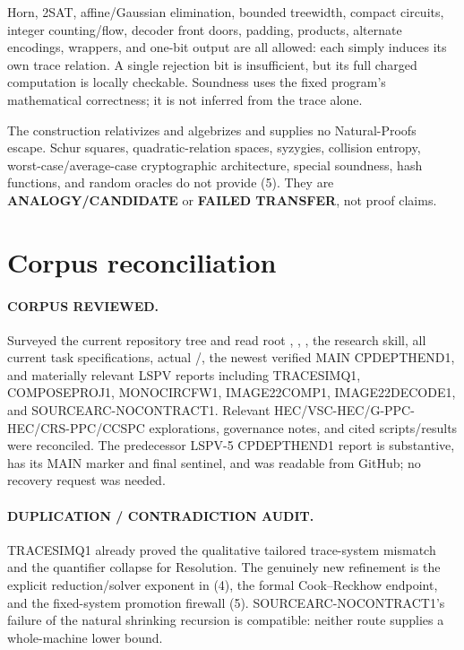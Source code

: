 \documentclass[11pt]{article}
\begin{document}
Horn, 2SAT, affine/Gaussian elimination, bounded treewidth, compact circuits,
integer counting/flow, decoder front doors, padding, products, alternate
encodings, wrappers, and one-bit output are all allowed: each simply induces
its own trace relation.  A single rejection bit is insufficient, but its full
charged computation is locally checkable.  Soundness uses the fixed program's
mathematical correctness; it is not inferred from the trace alone.

The construction relativizes and algebrizes and supplies no Natural-Proofs
escape.  Schur squares, quadratic-relation spaces, syzygies, collision
entropy, worst-case/average-case cryptographic architecture, special
soundness, hash functions, and random oracles do not provide (5).  They are
\textbf{ANALOGY/CANDIDATE} or \textbf{FAILED TRANSFER}, not proof claims.

\section{Corpus reconciliation}
\paragraph{CORPUS REVIEWED.}
Surveyed the current repository tree and read root ,
, , the research skill, all current task
specifications, actual /, the newest verified
MAIN CPDEPTHEND1, and materially relevant LSPV reports including TRACESIMQ1,
COMPOSEPROJ1, MONOCIRCFW1, IMAGE22COMP1, IMAGE22DECODE1, and
SOURCEARC-NOCONTRACT1.  Relevant HEC/VSC-HEC/G-PPC-HEC/CRS-PPC/CCSPC
explorations, governance notes, and cited scripts/results were reconciled.
The predecessor LSPV-5 CPDEPTHEND1 report is substantive, has its MAIN marker
and final sentinel, and was readable from GitHub; no recovery request was
needed.

\paragraph{DUPLICATION / CONTRADICTION AUDIT.}
TRACESIMQ1 already proved the qualitative tailored trace-system mismatch and
the quantifier collapse for Resolution.  The genuinely new refinement is the
explicit reduction/solver exponent in (4), the formal Cook--Reckhow endpoint,
and the fixed-system promotion firewall (5).  SOURCEARC-NOCONTRACT1's failure
of the natural shrinking recursion is compatible: neither route supplies a
whole-machine lower bound.
\end{document}
